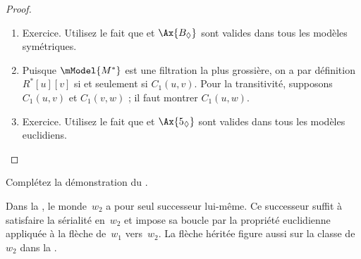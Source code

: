 \documentclass[../../../include/open-logic-section]{subfiles}
\begin{document}
\begin{proof}
\begin{enumerate}
  \item Exercice. Utilisez le fait que  et $\Ax{B_\Diamond}$
    sont valides dans tous les modèles symétriques.
  \item Puisque $\mModel{M^*}$ est une filtration la plus grossière,
    on a par définition $R^*[u][v]$ si et seulement si $C_1(u,v)$.
    Pour la transitivité, supposons $C_1(u,v)$ et $C_1(v,w)$ ; il
    faut montrer $C_1(u,w)$. 
  \item Exercice. Utilisez le fait que  et $\Ax{5_\Diamond}$
    sont valides dans tous les modèles euclidiens.
\end{enumerate}
\end{proof}

\begin{prob}
  Complétez la démonstration du .
\end{prob}
\begin{explain}
Dans la , le monde~$w_2$ a pour seul
successeur lui-même. Ce successeur suffit à satisfaire la
sérialité en~$w_2$ et impose sa boucle par la propriété
euclidienne appliquée à la flèche de~$w_1$ vers~$w_2$.
La flèche héritée figure aussi sur la classe de~$w_2$
dans la .
\end{explain}
\end{document}
